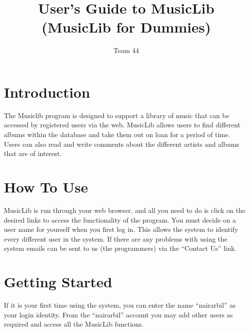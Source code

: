 \documentclass{article}
\title{User's Guide to MusicLib (MusicLib for Dummies)}
\author{Team 44}
\begin{document}
\maketitle
\tableofcontents
\newpage
\section{Introduction}
The Musiclib program is designed to support a library of music that can be accessed by registered users via the web. MusicLib allows users to find different albums within the database and take them out on loan for a period of time. Users can also read and write comments about the different artists and albums that are of interest.

\section{How To Use}
MusicLib is run through your web browser, and all you need to do is click on the desired links to access the functionality of the program. You must decide on a user name for yourself when you first log in. This allows the system to identify every different user in the system. If there are any problems with using the system emails can be sent to us (the programmers) via the ``Contact Us'' link. 
\section{Getting Started}
If it is your first time using the system, you can enter the name ``nairarbil'' as your login identity. From the ``nairarbil'' account you may add other users as required and access all the MusicLib functions. 
\end{document}

